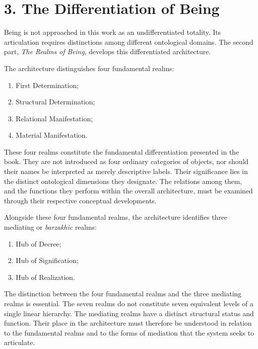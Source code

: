 
\section*{3. The Differentiation of Being}

Being is not approached in this work as an undifferentiated
totality. Its articulation requires distinctions among
different ontological domains. The second part,
\textit{The Realms of Being}, develops this differentiated
architecture.

The architecture distinguishes four fundamental realms:

\begin{enumerate}
    \item First Determination;
    \item Structural Determination;
    \item Relational Manifestation;
    \item Material Manifestation.
\end{enumerate}

These four realms constitute the fundamental differentiation
presented in the book. They are not introduced as four
ordinary categories of objects, nor should their names be
interpreted as merely descriptive labels. Their significance
lies in the distinct ontological dimensions they designate.
The relations among them, and the functions they perform
within the overall architecture, must be examined through
their respective conceptual developments.

Alongside these four fundamental realms, the architecture
identifies three mediating or \textit{barzakhic} realms:

\begin{enumerate}
    \item Hub of Decree;
    \item Hub of Signification;
    \item Hub of Realization.
\end{enumerate}

The distinction between the four fundamental realms and
the three mediating realms is essential. The seven realms
do not constitute seven equivalent levels of a single
linear hierarchy. The mediating realms have a distinct
structural status and function. Their place in the
architecture must therefore be understood in relation
to the fundamental realms and to the forms of mediation
that the system seeks to articulate.

